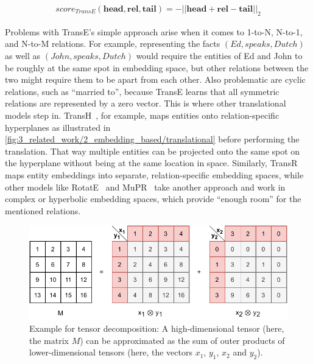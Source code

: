 \begin{align}
    score_{TransE}(\textbf{head}, \textbf{rel}, \textbf{tail}) = {- || \textbf{head} + \textbf{rel} - \textbf{tail} ||}_{2}
    \label{eq:3_related_work/2_embedding_based/trans_e}
\end{align}

Problems with TransE's simple approach arise when it comes to 1-to-N, N-to-1, and N-to-M relations. For example, representing the facts $(Ed, speaks, Dutch)$ as well as $(John, speaks, Dutch)$ would require the entities of Ed and John to be roughly at the same spot in embedding space, but other relations between the two might require them to be apart from each other. Also problematic are cyclic relations, such as ``married to'', because TransE learns that all symmetric relations are represented by a zero vector. This is where other translational models step in. TransH~\cite{Wang2014KnowledgeGE}, for example, maps entities onto relation-specific hyperplanes as illustrated in \autoref{fig:3_related_work/2_embedding_based/translational} before performing the translation. That way multiple entities can be projected onto the same spot on the hyperplane without being at the same location in space. Similarly, TransR~\cite{Lin2015LearningEA} maps entity embeddings into separate, relation-specific embedding spaces, while other models like RotatE~\cite{Sun2019RotatEKG} and MuPR~\cite{Balazevic2019MultirelationalPG} take another approach and work in complex or hyperbolic embedding spaces, which provide ``enough room'' for the mentioned relations.

\begin{figure}[t]
    \centering
    \includegraphics{3_related_work/2_embedding_based/tensor_decomposition}
    \caption{Example for tensor decomposition: A high-dimensional tensor (here, the matrix $M$) can be approximated as the sum of outer products of lower-dimensional tensors (here, the vectors $x_1$, $y_1$, $x_2$ and $y_2$).}
    \label{fig:3_related_work/2_embedding_based/tensor_decomposition}
\end{figure}

